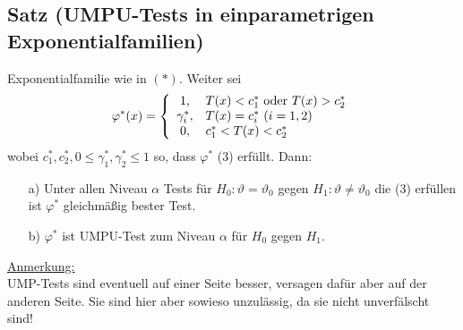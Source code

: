 \documentclass[a4paper,11pt,twoside,titlepage]{article}
\begin{document}
\subsection{Satz (UMPU-Tests in einparametrigen Exponentialfamilien)}
Exponentialfamilie wie in $(\ast)$. Weiter sei 
$$\varphi^\ast(x)=\left\{
\begin{array}{cl}
1,&T(x)<c_1^\ast \textnormal{ oder }T(x)>c_2^\ast\\
\gamma_i^\ast,&T(x)=c_i^\ast\ (i=1,2)\\
0,&c_1^\ast<T(x)<c_2^\ast\\
\end{array}\right.$$
wobei $c_1^\ast,c_2^\ast,0\leq \gamma_1^\ast,\gamma_2^\ast\leq1$ so, dass $\varphi^\ast$ (3) erfüllt. Dann:
\begin{itemize}
\item[a) ]Unter allen Niveau $\alpha$ Tests für $H_0: \vartheta=\vartheta_0$ gegen $H_1: \vartheta\neq\vartheta_0$
die (3) erfüllen ist $\varphi^\ast$ gleichmäßig bester Test.
\item[b) ]$\varphi^\ast$ ist UMPU-Test zum Niveau $\alpha$ für $H_0$ gegen $H_1$.
\end{itemize}

\underline{Anmerkung:}\\
UMP-Tests sind eventuell auf einer Seite besser, versagen dafür aber auf der anderen Seite. Sie sind hier aber sowieso unzulässig, da sie nicht unverfälscht sind!

\end{document}

